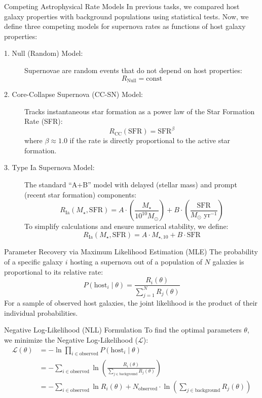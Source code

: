 \documentclass[9pt]{beamer}
\begin{document}
\begin{frame}{Competing Astrophysical Rate Models}
  In previous tasks, we compared host galaxy properties with background populations using statistical tests. Now, we define three competing models for supernova rates as functions of host galaxy properties:
  \begin{description}
    \item[1. Null (Random) Model:] Supernovae are random events that do not depend on host properties:
      $$R_{\text{Null}} = \text{const}$$
    \item[2. Core-Collapse Supernova (CC-SN) Model:] Tracks instantaneous star formation as a power law of the Star Formation Rate (SFR):
      $$R_{\text{CC}}(\text{SFR}) = \text{SFR}^\beta$$
      where $\beta \approx 1.0$ if the rate is directly proportional to the active star formation.
    \item[3. Type Ia Supernova Model:] The standard ``A+B'' model with delayed (stellar mass) and prompt (recent star formation) components:
      $$R_{\text{Ia}}(M_\star, \text{SFR}) = A \cdot \left(\frac{M_\star}{10^{10} M_\odot}\right) + B \cdot \left(\frac{\text{SFR}}{M_\odot \text{ yr}^{-1}}\right)$$
      To simplify calculations and ensure numerical stability, we define:
      $$R_{\text{Ia}}(M_\star, \text{SFR}) = A \cdot M_{\star, 10} + B \cdot \text{SFR}$$
  \end{description}
\end{frame}

\begin{frame}{Parameter Recovery via Maximum Likelihood Estimation (MLE)}
  The probability of a specific galaxy $i$ hosting a supernova out of a population of $N$ galaxies is proportional to its relative rate:
  $$P(\text{host}_i \mid \theta) = \frac{R_i(\theta)}{\sum_{j=1}^N R_j(\theta)}$$
  For a sample of observed host galaxies, the joint likelihood is the product of their individual probabilities.
  \begin{block}{Negative Log-Likelihood (NLL) Formulation}
    To find the optimal parameters $\theta$, we minimize the Negative Log-Likelihood ($\mathcal{L}$):
    \begin{align*}
      \mathcal{L}(\theta) &= - \ln \prod_{i \in \text{observed}} P(\text{host}_i \mid \theta) \\
      &= - \sum_{i \in \text{observed}} \ln \left( \frac{R_i(\theta)}{\sum_{j \in \text{background}} R_j(\theta)} \right) \\
      &= -\sum_{i \in \text{observed}} \ln R_i(\theta) + N_{\text{observed}} \cdot \ln \left(\sum_{j \in \text{background}} R_j(\theta)\right)
    \end{align*}
  \end{block}
\end{frame}
\end{document}
